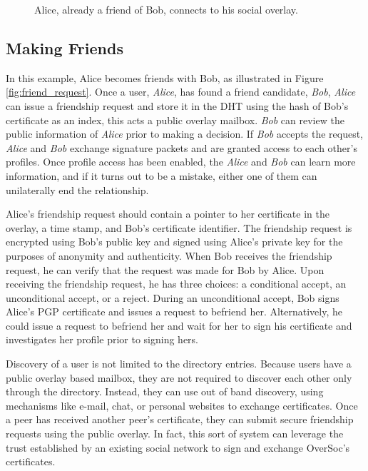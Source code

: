 \documentclass{IEEEtran}
\begin{document}
\begin{figure*}[h!t!]
\centering
{}
\caption{Alice, already a friend of Bob, connects to his social overlay.}
\label{fig:friendship_join}
\end{figure*}

\subsection{Making Friends}

In this example, Alice becomes friends with Bob, as illustrated in Figure
\ref{fig:friend_request}.  Once a user, \textit{Alice}, has found a friend
candidate, \textit{Bob}, \textit{Alice} can issue a friendship request and
store it in the DHT using the hash of Bob's certificate as an index, this acts
a public overlay mailbox.  \textit{Bob} can review the public information of
\textit{Alice} prior to making a decision.  If \textit{Bob} accepts the
request, \textit{Alice} and \textit{Bob} exchange signature packets and are
granted access to each other's profiles.  Once profile access has been enabled,
the \textit{Alice} and \textit{Bob} can learn more information, and if it turns
out to be a mistake, either one of them can unilaterally end the relationship.

Alice's friendship request should contain a pointer to her certificate in the
overlay, a time stamp, and Bob's certificate identifier.  The friendship
request is encrypted using Bob's public key and signed using Alice's private
key for the purposes of anonymity and authenticity.  When Bob receives the
friendship request, he can verify that the request was made for Bob by Alice.
Upon receiving the friendship request, he has three choices:  a conditional
accept, an unconditional accept, or a reject.  During an unconditional accept,
Bob signs Alice's PGP certificate and issues a request to befriend her.
Alternatively, he could issue a request to befriend her and wait for her to
sign his certificate and investigates her profile prior to signing hers.

Discovery of a user is not limited to the directory entries.  Because users
have a public overlay based mailbox, they are not required to discover each
other only through the directory.  Instead, they can use out of band discovery,
using mechanisms like e-mail, chat, or personal websites to exchange
certificates.  Once a peer has received another peer's certificate, they can
submit secure friendship requests using the public overlay.  In fact, this sort
of system can leverage the trust established by an existing social network to
sign and exchange OverSoc's certificates.  
\end{document}
